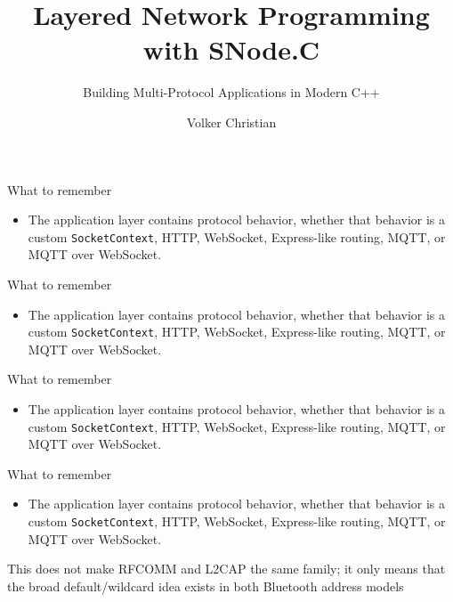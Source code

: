 \documentclass[
  a4paper,
  openany]{book}
\title{Layered Network Programming with SNode.C}
\subtitle{Building Multi-Protocol Applications in Modern C++}
\author{Volker Christian}
\date{}
\providecommand{\tightlist}{%
  \setlength{\itemsep}{0pt}\setlength{\parskip}{0pt}}
\providecommand{\passthrough}[1]{#1}
\begin{document}
\raggedbottom
{}
\begin{snodecrememberbox}{What to remember}\begin{itemize}\tightlist\item The application layer contains protocol behavior, whether that
  behavior is a custom \passthrough{\lstinline!SocketContext!}, HTTP,
  WebSocket, Express-like routing, MQTT, or MQTT over WebSocket.\par\end{itemize}\end{snodecrememberbox}
\clearpage
{}
\begin{snodecrememberbox}{What to remember}\begin{itemize}\tightlist\item The application layer contains protocol behavior, whether that
  behavior is a custom \passthrough{\lstinline!SocketContext!}, HTTP,
  WebSocket, Express-like routing, MQTT, or MQTT over WebSocket.\par\end{itemize}\end{snodecrememberbox}
\clearpage
{}
\begin{snodecrememberbox}{What to remember}\begin{itemize}\tightlist\item The application layer contains protocol behavior, whether that
  behavior is a custom \passthrough{\lstinline!SocketContext!}, HTTP,
  WebSocket, Express-like routing, MQTT, or MQTT over WebSocket.\par\end{itemize}\end{snodecrememberbox}
\clearpage
{}
\begin{snodecrememberbox}{What to remember}\begin{itemize}\tightlist\item \begingroup\raggedright The application layer contains protocol behavior, whether that
  behavior is a custom \passthrough{\lstinline!SocketContext!}, HTTP,
  WebSocket, Express-like routing, MQTT, or MQTT over WebSocket.\par\endgroup\end{itemize}\end{snodecrememberbox}
\clearpage
{}
This does not make RFCOMM and L2CAP the same family; it only means that
the broad default/wildcard idea exists in both Bluetooth address models
\end{document}
